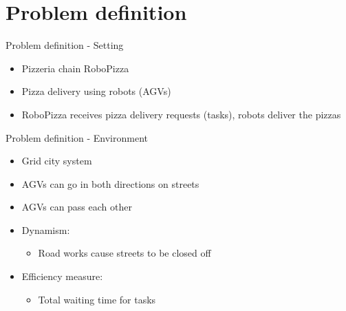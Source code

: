 \section{Problem definition}

\begin{frame}{Problem definition - Setting}
    \begin{itemize}
        \item Pizzeria chain RoboPizza
        \item Pizza delivery using robots (AGVs)
        \item RoboPizza receives pizza delivery requests (tasks), robots deliver the pizzas
    \end{itemize}
\end{frame}

\begin{frame}{Problem definition - Environment}
    \begin{itemize}
        \item Grid city system
        \item AGVs can go in both directions on streets
        \item AGVs can pass each other

        \item Dynamism:
        \begin{itemize}
            \item Road works cause streets to be closed off
        \end{itemize}

        \item Efficiency measure:
        \begin{itemize}
            \item Total waiting time for tasks
        \end{itemize}
    \end{itemize}
\end{frame}

